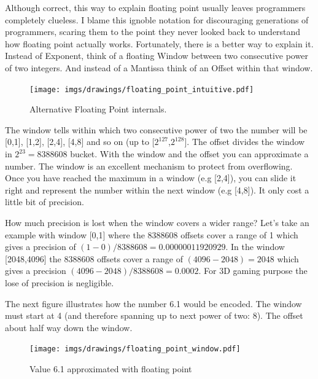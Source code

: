 \documentclass[book.tex]{subfiles}
\begin{document}
Although correct, this way to explain floating point usually leaves programmers completely clueless. I blame this ignoble notation for discouraging generations of programmers, scaring them to the point they never looked back to understand how floating point actually works. Fortunately, there is a better way to explain it. Instead of Exponent, think of a floating Window between two consecutive power of two integers. And instead of a Mantissa think of an Offset within that window.\\ 
\par
  
\begin{figure}[H]
\centering
\texttt{[image: imgs/drawings/floating\_point\_intuitive.pdf]}
\caption{Alternative Floating Point internals.}
\end{figure}
  \bigskip  
The window tells within which two consecutive power of two the number will be [0,1], [1,2], [2,4], [4,8] and so on (up to [$2^{127}$,$2^{128}$]. The offset divides the window in $ 2^{23} = 8388608 $  bucket. With the window and the offset you can approximate a number. The window is an excellent mechanism to protect from overflowing. Once you have reached the maximum in a window (e.g [2,4]), you can slide it right and represent the number within the next window (e.g [4,8]). It only cost a little bit of precision.\\


\par {} How much precision is lost when the window covers a wider range? Let's take an example with window [0,1] where the 8388608 offsets cover a range of 1 which gives a precision of $(1-0)/8388608=0.00000011920929$. In the window [2048,4096] the 8388608 offsets cover a range of $(4096-2048) = 2048$ which gives a precision $ (4096-2048)/8388608=0.0002$. For 3D gaming purpose the lose of precision is negligible.\\
\par

The next figure illustrates how the number 6.1 would be encoded. The window must start at 4 (and therefore spanning up to next power of two: 8). The offset about half way down the window.

\begin{figure}[H]
\centering
\texttt{[image: imgs/drawings/floating\_point\_window.pdf]}

\caption{Value 6.1 approximated with floating point}
\label{fig:fp_internals_window6_1}
\end{figure}
  \bigskip
  
\end{document}
